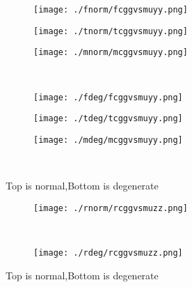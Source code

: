 \documentclass[aps,floats,floatfix,nofootinbib]{revtex4-1}
\begin{document}
\begin{center}
\begin{figure}
\begin{subfigure}{0.3\textwidth}
\texttt{[image: ./fnorm/fcggvsmuyy.png]}
\label{}
\end{subfigure}
\begin{subfigure}{0.3\textwidth}
\texttt{[image: ./tnorm/tcggvsmuyy.png]}
\label{}
\end{subfigure}
\begin{subfigure}{0.3\textwidth}
\texttt{[image: ./mnorm/mcggvsmuyy.png]}
\label{}
\end{subfigure}\\
\begin{subfigure}{0.3\textwidth}
\texttt{[image: ./fdeg/fcggvsmuyy.png]}
\label{}
\end{subfigure}
\begin{subfigure}{0.3\textwidth}
\texttt{[image: ./tdeg/tcggvsmuyy.png]}
\label{}
\end{subfigure}
\begin{subfigure}{0.3\textwidth}
\texttt{[image: ./mdeg/mcggvsmuyy.png]}
\label{}
\end{subfigure}\\
\caption{Top is normal,Bottom is degenerate}
\end{figure}
\end{center}

\begin{center}
\begin{figure}
\begin{subfigure}{0.95\textwidth}
\texttt{[image: ./rnorm/rcggvsmuzz.png]}
\label{}
\end{subfigure}\\
\begin{subfigure}{0.95\textwidth}
\texttt{[image: ./rdeg/rcggvsmuzz.png]}
\label{}
\end{subfigure}
\caption{Top is normal,Bottom is degenerate}
\end{figure}
\end{center}
\end{document}
